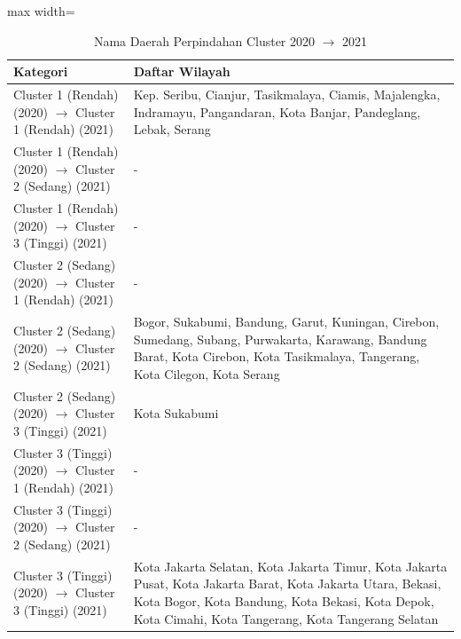 \begin{table}[H]
\centering
\caption{Nama Daerah Perpindahan Cluster 2020 \(\rightarrow\) 2021} \label{tab:apptransname2020x2021}
\begin{adjustbox}{max width=\textwidth}
\begin{tabular}{|p{4cm}|p{10cm}|}
\hline
\textbf{Kategori} & \textbf{Daftar Wilayah} \\
\hline
Cluster 1 (Rendah) (2020) \(\rightarrow\) Cluster 1 (Rendah) (2021) & Kep. Seribu, Cianjur, Tasikmalaya, Ciamis, Majalengka, Indramayu, Pangandaran, Kota Banjar, Pandeglang, Lebak, Serang \\
\hline
Cluster 1 (Rendah) (2020) \(\rightarrow\) Cluster 2 (Sedang) (2021) & - \\
\hline
Cluster 1 (Rendah) (2020) \(\rightarrow\) Cluster 3 (Tinggi) (2021) & - \\
\hline
Cluster 2 (Sedang) (2020) \(\rightarrow\) Cluster 1 (Rendah) (2021) & - \\
\hline
Cluster 2 (Sedang) (2020) \(\rightarrow\) Cluster 2 (Sedang) (2021) & Bogor, Sukabumi, Bandung, Garut, Kuningan, Cirebon, Sumedang, Subang, Purwakarta, Karawang, Bandung Barat, Kota Cirebon, Kota Tasikmalaya, Tangerang, Kota Cilegon, Kota Serang \\
\hline
Cluster 2 (Sedang) (2020) \(\rightarrow\) Cluster 3 (Tinggi) (2021) & Kota Sukabumi \\
\hline
Cluster 3 (Tinggi) (2020) \(\rightarrow\) Cluster 1 (Rendah) (2021) & - \\
\hline
Cluster 3 (Tinggi) (2020) \(\rightarrow\) Cluster 2 (Sedang) (2021) & - \\
\hline
Cluster 3 (Tinggi) (2020) \(\rightarrow\) Cluster 3 (Tinggi) (2021) & Kota Jakarta Selatan, Kota Jakarta Timur, Kota Jakarta Pusat, Kota Jakarta Barat, Kota Jakarta Utara, Bekasi, Kota Bogor, Kota Bandung, Kota Bekasi, Kota Depok, Kota Cimahi, Kota Tangerang, Kota Tangerang Selatan \\
\hline
\end{tabular}
\end{adjustbox}
\end{table}
